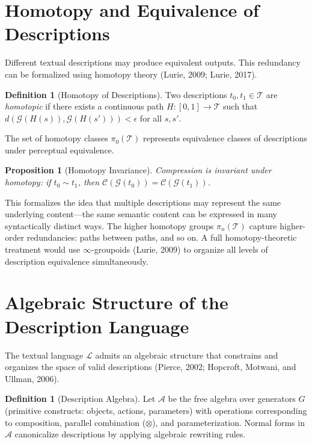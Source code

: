 \documentclass[11pt,a4paper]{article}
\newtheorem{proposition}[theorem]{Proposition}
\theoremstyle{definition}
\newtheorem{definition}[theorem]{Definition}
\theoremstyle{remark}
\begin{document}
\section{Homotopy and Equivalence of Descriptions}
\label{sec:homotopy}

Different textual descriptions may produce equivalent outputs. This redundancy can be formalized using homotopy theory (Lurie, 2009; Lurie, 2017).

\begin{definition}[Homotopy of Descriptions]
Two descriptions $t_0, t_1 \in \mathcal{T}$ are \emph{homotopic} if there exists a continuous path $H : [0,1] \to \mathcal{T}$ such that $d(\mathcal{G}(H(s)), \mathcal{G}(H(s'))) < \epsilon$ for all $s,s'$.
\end{definition}

The set of homotopy classes $\pi_0(\mathcal{T})$ represents equivalence classes of descriptions under perceptual equivalence.

\begin{proposition}[Homotopy Invariance]
Compression is invariant under homotopy: if $t_0 \sim t_1$, then $\mathcal{C}(\mathcal{G}(t_0)) = \mathcal{C}(\mathcal{G}(t_1))$.
\end{proposition}

This formalizes the idea that multiple descriptions may represent the same underlying content---the same semantic content can be expressed in many syntactically distinct ways. The higher homotopy groups $\pi_n(\mathcal{T})$ capture higher-order redundancies: paths between paths, and so on. A full homotopy-theoretic treatment would use $\infty$-groupoids (Lurie, 2009) to organize all levels of description equivalence simultaneously.

\section{Algebraic Structure of the Description Language}
\label{sec:algebra}

The textual language $\mathcal{L}$ admits an algebraic structure that constrains and organizes the space of valid descriptions (Pierce, 2002; Hopcroft, Motwani, and Ullman, 2006).

\begin{definition}[Description Algebra]
Let $\mathcal{A}$ be the free algebra over generators $G$ (primitive constructs: objects, actions, parameters) with operations corresponding to composition, parallel combination ($\otimes$), and parameterization. Normal forms in $\mathcal{A}$ canonicalize descriptions by applying algebraic rewriting rules.
\end{definition}
\end{document}
